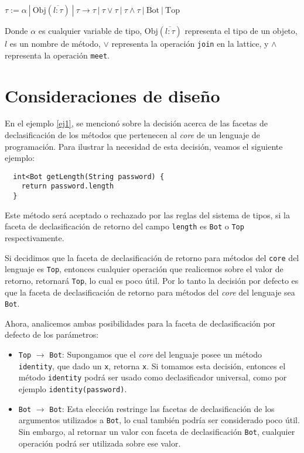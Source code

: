 \begin{defn}
  \normalfont
  $\tau := \alpha\ |\ \text{Obj}(\overline{l: \tau})\ |\ \tau \rightarrow \tau \ |\ \tau \vee \tau\ |\ \tau \wedge \tau \ |\ \text{Bot}\ |\ \text{Top}$
\end{defn}

Donde $\alpha$ es cualquier variable de tipo, $\text{Obj}(\overline{l: \tau})$ representa el tipo de un objeto, $l$ es un nombre de método, $\vee$ representa la operación \texttt{join} en la lattice, y $\wedge$ representa la operación \texttt{meet}.

\section{Consideraciones de diseño}

En el ejemplo \ref{ej1}, se mencionó sobre la decisión acerca de las facetas de declasificación de los métodos que pertenecen al \textit{core} de un lenguaje de programación. Para ilustrar la necesidad de esta decisión, veamos el siguiente ejemplo:

\begin{lstlisting}
  int<Bot getLength(String password) {
    return password.length
  }
\end{lstlisting}

Este método será aceptado o rechazado por las reglas del sistema de tipos, si la faceta de declasificación de retorno del campo \texttt{length} es \texttt{Bot} o \texttt{Top} respectivamente.

Si decidimos que la faceta de declasificación de retorno para métodos del \texttt{core} del lenguaje es \texttt{Top}, entonces cualquier operación que realicemos sobre el valor de retorno, retornará \texttt{Top}, lo cual es poco útil. Por lo tanto la decisión por defecto es que la faceta de declasificación de retorno para métodos del \textit{core} del lenguaje sea \texttt{Bot}.

Ahora, analicemos ambas posibilidades para la faceta de declasificación por defecto de los parámetros:

\begin{itemize}
  \item \texttt{Top} $\rightarrow$ \texttt{Bot}: Supongamos que el \textit{core} del lenguaje posee un método \texttt{identity}, que dado un \texttt{x}, retorna \texttt{x}. Si tomamos esta decisión, entonces el método \texttt{identity} podrá ser usado como declasificador universal, como por ejemplo \texttt{identity(password)}.
  \item \texttt{Bot} $\rightarrow$ \texttt{Bot}: Esta elección restringe las facetas de declasificación de los argumentos utilizados a \texttt{Bot}, lo cual también podría ser considerado poco útil. Sin embargo, al retornar un valor con faceta de declasificación \texttt{Bot}, cualquier operación podrá ser utilizada sobre ese valor.
\end{itemize}

